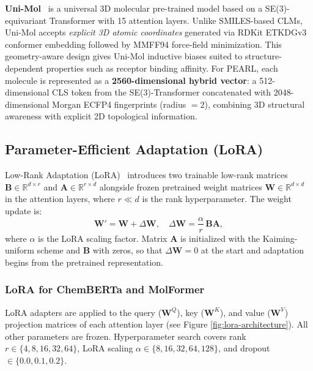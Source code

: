 \documentclass[pdflatex,sn-mathphys-num]{sn-jnl}%
\begin{document}
\textbf{Uni-Mol}~\cite{zhou2023unimol} is a universal 3D molecular pre-trained model based on a SE(3)-equivariant Transformer with 15 attention layers. Unlike SMILES-based CLMs, Uni-Mol accepts \emph{explicit 3D atomic coordinates} generated via RDKit ETKDGv3 conformer embedding followed by MMFF94 force-field minimization. This geometry-aware design gives Uni-Mol inductive biases suited to structure-dependent properties such as receptor binding affinity. For PEARL, each molecule is represented as a \textbf{2560-dimensional hybrid vector}: a 512-dimensional CLS token from the SE(3)-Transformer concatenated with 2048-dimensional Morgan ECFP4 fingerprints (radius $= 2$), combining 3D structural awareness with explicit 2D topological information.

\subsection{Parameter-Efficient Adaptation (LoRA)}\label{sec:lora}
Low-Rank Adaptation (LoRA)~\cite{hu2021lora} introduces two trainable low-rank matrices $\mathbf{B} \in \mathbb{R}^{d \times r}$ and $\mathbf{A} \in \mathbb{R}^{r \times d}$ alongside frozen pretrained weight matrices $\mathbf{W} \in \mathbb{R}^{d \times d}$ in the attention layers, where $r \ll d$ is the rank hyperparameter. The weight update is:
\begin{equation}
  \mathbf{W}' = \mathbf{W} + \Delta\mathbf{W}, \quad \Delta\mathbf{W} = \frac{\alpha}{r}\,\mathbf{B}\mathbf{A},
\end{equation}
where $\alpha$ is the LoRA scaling factor. Matrix $\mathbf{A}$ is initialized with the Kaiming-uniform scheme and $\mathbf{B}$ with zeros, so that $\Delta\mathbf{W}=0$ at the start and adaptation begins from the pretrained representation.

\subsubsection{LoRA for ChemBERTa and MolFormer}
LoRA adapters are applied to the query ($\mathbf{W}^Q$), key ($\mathbf{W}^K$), and value ($\mathbf{W}^V$) projection matrices of each attention layer (see Figure \ref{fig:lora-architecture}). All other parameters are frozen. Hyperparameter search covers rank $r \in \{4, 8, 16, 32, 64\}$, LoRA scaling $\alpha \in \{8, 16, 32, 64, 128\}$, and dropout $\in \{0.0, 0.1, 0.2\}$.
\end{document}
